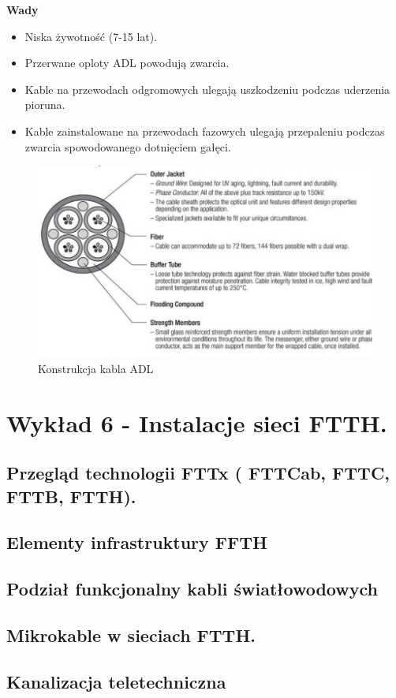 \documentclass{article}
\begin{document}
\textbf{Wady}
\begin{itemize}
    \item Niska żywotność (7-15 lat).
    \item Przerwane oploty ADL powodują zwarcia.
    \item Kable na przewodach odgromowych ulegają uszkodzeniu podczas uderzenia pioruna.
    \item Kable zainstalowane na przewodach fazowych ulegają przepaleniu podczas zwarcia spowodowanego dotnięciem gałęci.
\end{itemize}

\begin{figure}[H]
    \centering
    \includegraphics[width=0.6\linewidth]{w05z08.jpg}
    \caption{Konstrukcja kabla ADL}
\end{figure}

\section{Wykład 6 - Instalacje sieci FTTH.}
\subsection{Przegląd technologii FTTx ( FTTCab, FTTC, FTTB, FTTH).}
\subsection{Elementy infrastruktury FFTH}
\subsection{Podział funkcjonalny kabli światłowodowych}
\subsection{Mikrokable w sieciach FTTH.}
\subsection{Kanalizacja teletechniczna}
\end{document}
